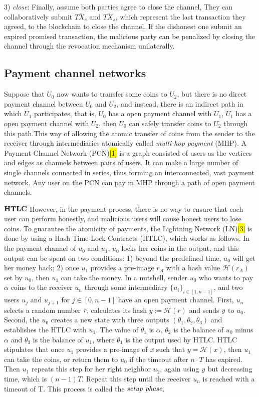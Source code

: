\documentclass[conference]{IEEEtran}
\begin{document}
3) \emph{close}: Finally, assume both parties agree to close the channel, They can collaboratively submit $\overline{TX_c}$ and 
$\overline{TX_s}$, which represent the last transaction they agreed, to the blockchain to close the channel. If the dishonest one 
submit an expired promised transaction, the malicious party can be penalized by closing the channel through the revocation mechanism unilaterally.


\subsection{Payment channel networks}

Suppose that $U_0$ now wants to transfer some coins to $U_2$, but there is no direct payment channel between $U_0$ and $U_2$, and instead, 
there is an indirect path in which $U_1$ participates, that is, $U_0$ has a open payment channel with $U_1$, $U_1$ has a open payment 
channel with $U_2$, then $U_0$ can safely transfer coins to $U_2$ through this path.This way of allowing the atomic transfer of coins 
from the sender to the receiver through intermediaries atomically called \emph{multi-hop payment} (MHP). A Payment Channel Network (PCN)\colorbox{yellow}{[1]} is 
a graph consisted of users as the vertices and edges as channels between pairs of users. It can make a large number of single channels 
connected in series, thus forming an interconnected, vast payment network. Any user on the PCN can pay in MHP through a path of open 
payment channels. 

\noindent $\bf{HTLC}$   However, in the payment process, there is no way to ensure that each user can perform honestly, and malicious users will 
cause honest users to lose coins. To guarantee the atomicity of payments, the Lightning Network (LN)\colorbox{yellow}{[3]} is done by 
using a Hash Time-Lock Contracts (HTLC), which works as follows. In the payment channel of $u_0$ and $u_1$, $u_0$ locks her coins in 
the output, and this output can be spent on two conditions: 1) beyond the predefined time, $u_0$ will get her money back; 2) once $u_1$ 
provides a pre-image $r_A$ with a hash value $\mathcal H(r_A)$ set by $u_0$, then $u_1$ can take the money. In a nutshell, sender $u_0$ 
who wants to pay $\alpha$ coins to the receiver $u_n$ through some intermediary ${\{u_i\}}_{i\in[1,n-1]}$, and two users $u_j$ and $u_{j+1}$ for 
$j \in [0,n-1]$ have an open payment channel. First, $u_n$ selects a random number $\emph{r}$, calculates its hash $y:= \mathcal H(r)$ 
and sends $\emph{y}$ to $u_0$. Second, the $u_0$ creates a new state with three outputs $(\theta_1, \theta_2, \theta_3)$ and establishes 
the HTLC with $u_1$. The value of $\theta_1$ is $\alpha$, $\theta_2$ is the balance of $u_0$ minus $\alpha$ and $\theta_3$ is the balance of $u_1$,
where $\theta_1$ is the output used by HTLC. HTLC stipulates that once $u_1$ provides a pre-image of $\emph{x}$ such that $y = \mathcal H(x)$, 
then $u_1$ can take the coins, or return them to $u_0$ if the timeout after $n\cdot T$ has expired. Then $u_1$ repeats this step for her right 
neighbor $u_2$, again using $\emph{y}$ but decreasing time, which is $(n-1)T$. Repeat this step until the receiver $u_n$ is reached with a 
timeout of T. This process is called the $\emph{setup phase}$. 
\end{document}

